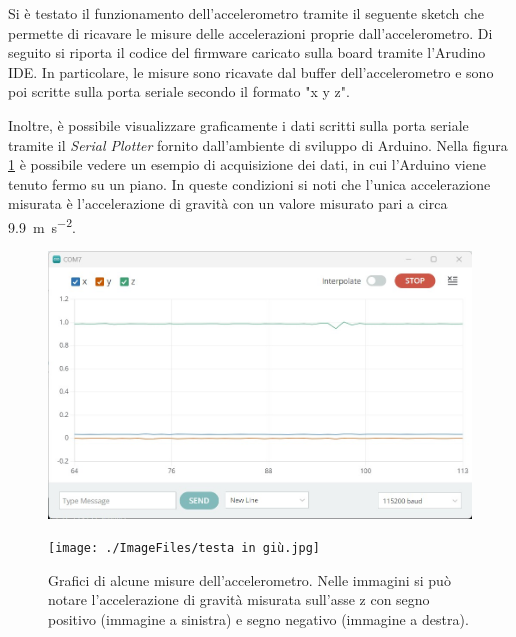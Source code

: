 Si è testato il funzionamento dell'accelerometro tramite il seguente sketch che permette di ricavare le misure delle accelerazioni proprie dall'accelerometro. Di seguito si riporta il codice del firmware caricato sulla board tramite l'Arudino IDE. In particolare, le misure sono ricavate dal buffer dell'accelerometro e sono poi scritte sulla porta seriale secondo il formato "{x} {y} {z}".


Inoltre, è possibile visualizzare graficamente i dati scritti sulla porta seriale tramite il \textit{Serial Plotter} fornito dall'ambiente di sviluppo di Arduino. Nella figura \ref{fig:serial_plotter} è possibile vedere un esempio di acquisizione dei dati, in cui l'Arduino viene tenuto fermo su un piano. In queste condizioni si noti che l'unica accelerazione misurata è l'accelerazione di gravità con un valore misurato pari a circa \SI{9.9}{\meter \per \second^2}.
\begin{figure}[tbh]
	\centering
	\begin{minipage}{.45\textwidth}
		\includegraphics[width=\linewidth]{./ImageFiles/fermo.jpg}
	\end{minipage}
	\begin{minipage}{.45\textwidth}
		\texttt{[image: ./ImageFiles/testa in giù.jpg]}
	\end{minipage}
	\caption{Grafici di alcune misure dell'accelerometro. Nelle immagini si può notare l'accelerazione di gravità misurata sull'asse z con segno positivo (immagine a sinistra) e segno negativo (immagine a destra).}
	\label{fig:serial_plotter}
\end{figure}

